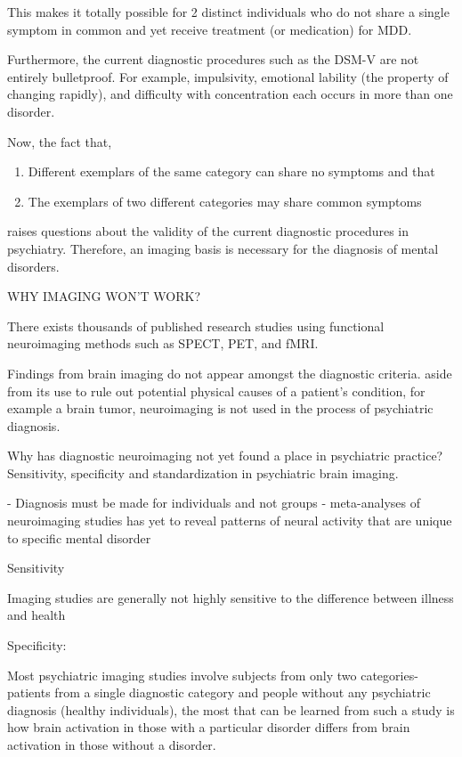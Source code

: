 \documentclass{article}
\begin{document}
This makes it totally possible for 2 distinct individuals who do not
share a single symptom in common and yet receive treatment (or
medication) for MDD.

Furthermore, the current diagnostic procedures such as the DSM-V are
not entirely bulletproof. For example, impulsivity, emotional lability
(the property of changing rapidly), and difficulty with concentration
each occurs in more than one disorder.

Now, the fact that,

\begin{enumerate}[nosep]
  \item Different exemplars of the same category can share no
    symptoms and that
  \item The exemplars of two different categories may share common
    symptoms
\end{enumerate}

raises questions about the validity of the current diagnostic
procedures in psychiatry. Therefore, an imaging basis is necessary for
the diagnosis of mental disorders.

WHY IMAGING WON'T WORK?

There exists thousands of published research studies using
functional neuroimaging methods such as SPECT, PET, and fMRI.

Findings from brain imaging do not appear amongst the diagnostic
criteria. aside from its use to rule out potential physical causes
of a patient's condition, for example a brain tumor, neuroimaging
is not used in the process of psychiatric diagnosis.

Why has diagnostic neuroimaging not yet found a place in
psychiatric practice? Sensitivity, specificity and standardization
in psychiatric brain imaging.

    - Diagnosis must be made for individuals and not groups
    - meta-analyses of neuroimaging studies has yet to reveal
      patterns of neural activity that are unique to specific
      mental disorder

Sensitivity

Imaging studies are generally not highly sensitive to the
difference between illness and health

Specificity:

Most psychiatric imaging studies involve subjects from only two
categories- patients from a single diagnostic category and people
without any psychiatric diagnosis (healthy individuals), the most
that can be learned from such a study is how brain activation in
those with a particular disorder differs from brain activation in
those without a disorder.
\end{document}
